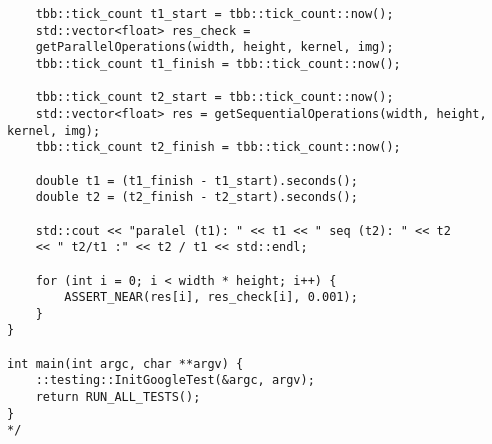 \documentclass{report}
\begin{document}
\begin{lstlisting}
	tbb::tick_count t1_start = tbb::tick_count::now();
	std::vector<float> res_check =
	getParallelOperations(width, height, kernel, img);
	tbb::tick_count t1_finish = tbb::tick_count::now();
	
	tbb::tick_count t2_start = tbb::tick_count::now();
	std::vector<float> res = getSequentialOperations(width, height, kernel, img);
	tbb::tick_count t2_finish = tbb::tick_count::now();
	
	double t1 = (t1_finish - t1_start).seconds();
	double t2 = (t2_finish - t2_start).seconds();
	
	std::cout << "paralel (t1): " << t1 << " seq (t2): " << t2
	<< " t2/t1 :" << t2 / t1 << std::endl;
	
	for (int i = 0; i < width * height; i++) {
		ASSERT_NEAR(res[i], res_check[i], 0.001);
	}
}

int main(int argc, char **argv) {
	::testing::InitGoogleTest(&argc, argv);
	return RUN_ALL_TESTS();
}
*/

\end{lstlisting}
\end{document}
